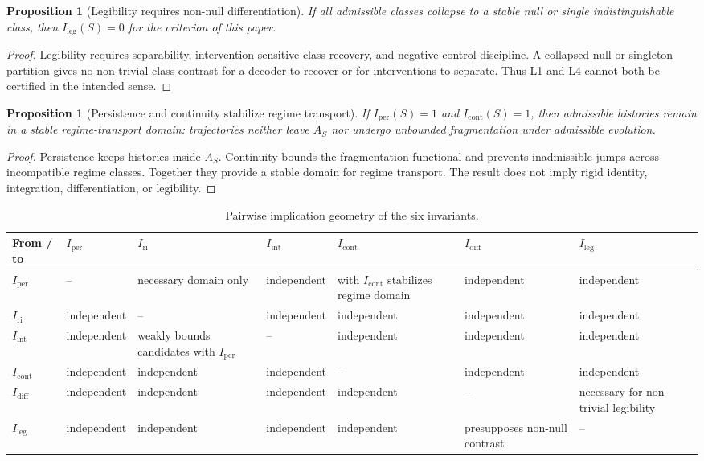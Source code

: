 \documentclass[11pt,a4paper]{article}
\newtheorem{proposition}[theorem]{Proposition}
\theoremstyle{definition}
\newcommand{\Iper}{I_{\mathrm{per}}}
\newcommand{\Iri}{I_{\mathrm{ri}}}
\newcommand{\Iint}{I_{\mathrm{int}}}
\newcommand{\Icont}{I_{\mathrm{cont}}}
\newcommand{\Idiff}{I_{\mathrm{diff}}}
\newcommand{\Ileg}{I_{\mathrm{leg}}}
\newcommand{\Aset}{A_S}
\begin{document}
\begin{proposition}[Legibility requires non-null differentiation]\label{prop:leg-requires-diff}
If all admissible classes collapse to a stable null or single indistinguishable
class, then $\Ileg(S)=0$ for the criterion of this paper.
\end{proposition}

\begin{proof}
Legibility requires separability, intervention-sensitive class recovery, and
negative-control discipline. A collapsed null or singleton partition gives no
non-trivial class contrast for a decoder to recover or for interventions to
separate. Thus L1 and L4 cannot both be certified in the intended sense.
\end{proof}

\begin{proposition}[Persistence and continuity stabilize regime transport]\label{prop:per-cont-regime-stability}
If $\Iper(S)=1$ and $\Icont(S)=1$, then admissible histories remain in a stable
regime-transport domain: trajectories neither leave $\Aset$ nor undergo
unbounded fragmentation under admissible evolution.
\end{proposition}

\begin{proof}
Persistence keeps histories inside $\Aset$. Continuity bounds the fragmentation
functional and prevents inadmissible jumps across incompatible regime classes.
Together they provide a stable domain for regime transport. The result does not
imply rigid identity, integration, differentiation, or legibility.
\end{proof}

\begin{table}[htbp]
\centering
\caption{Pairwise implication geometry of the six invariants.}
\label{tab:invariant-implication-geometry}
\small
\begin{tabularx}{\linewidth}{@{}lYYYYYY@{}}
\toprule
From / to & $\Iper$ & $\Iri$ & $\Iint$ & $\Icont$ & $\Idiff$ & $\Ileg$ \\
\midrule
$\Iper$ & -- & necessary domain only & independent & with $\Icont$ stabilizes regime domain & independent & independent \\
$\Iri$ & independent & -- & independent & independent & independent & independent \\
$\Iint$ & independent & weakly bounds candidates with $\Iper$ & -- & independent & independent & independent \\
$\Icont$ & independent & independent & independent & -- & independent & independent \\
$\Idiff$ & independent & independent & independent & independent & -- & necessary for non-trivial legibility \\
$\Ileg$ & independent & independent & independent & independent & presupposes non-null contrast & -- \\
\bottomrule
\end{tabularx}
\end{table}
\end{document}
